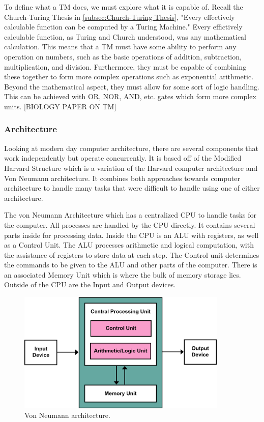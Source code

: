 To define what a TM does, we must explore what it is capable of.
Recall the Church-Turing Thesis in \ref{subsec:Church-Turing Thesis}, "Every effectively calculable function can be computed by a Turing Machine."
Every effictively calculable function, as Turing and Church understood, was any mathematical calculation.
This means that a TM must have some ability to perform any operation on numbers, such as the basic operations of addition, subtraction, multiplication, and division.
Furthermore, they must be capable of combining these together to form more complex operations such as exponential arithmetic.
Beyond the mathematical aspect, they must allow for some sort of logic handling.
This can be achieved with OR, NOR, AND, etc. gates which form more complex units.
[BIOLOGY PAPER ON TM]

\subsubsection{Architecture}\label{subsubsec:Arch}

Looking at modern day computer architecture, there are several components that work independently but operate concurrently.
It is based off of the Modified Harvard Structure which is a variation of the Harvard computer architecture and Von Neumann architecture.
It combines both approaches towards computer architecture to handle many tasks that were difficult to handle using one of either architecture.

The von Neumann Architecture which has a centralized CPU to handle tasks for the computer.
All processes are handled by the CPU directly.
It contains several parts inside for processing data.
Inside the CPU is an ALU with registers, as well as a Control Unit.
The ALU processes arithmetic and logical computation, with the assistance of registers to store data at each step.
The Control unit determines the commands to be given to the ALU and other parts of the computer.
There is an associated Memory Unit which is where the bulk of memory storage lies.
Outside of the CPU are the Input and Output devices.

\begin{figure}[htb]
    \centering
    \includegraphics[width=10cm]{Images/Von_Neumann_Architecture.png}
       \caption{Von Neumann architecture.}
           \label{Fig:VonNeumannArch}
\end{figure}

